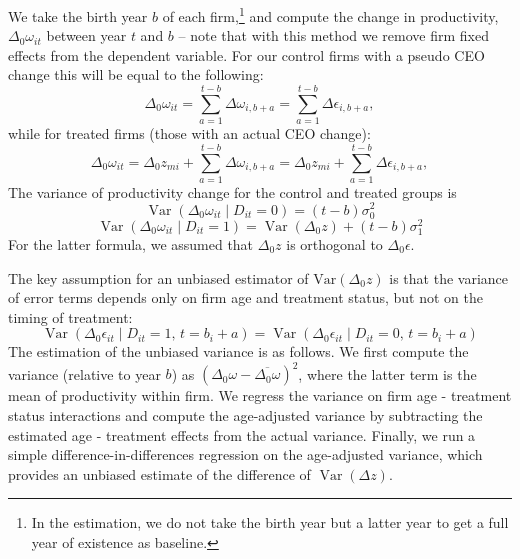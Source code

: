 \documentclass[11pt,a4paper]{article}
\newcommand{\Var}{\text{Var}}
\begin{document}
We take the birth year $b$ of each firm,\footnote{In the estimation, we do not take the birth year but a latter year to get a full year of existence as baseline.} and compute the change in productivity, $\Delta_0\omega_{it}$ between year $t$ and $b$ -- note that with this method we remove firm fixed effects from the dependent variable. For our control firms with a pseudo CEO change this will be equal to the following: 
\begin{equation}
    \Delta_{0}\omega_{it} = \sum_{a=1}^{t-b} \Delta \omega_{i,b+a} 
= \sum_{a=1}^{t-b} \Delta \epsilon_{i,b+a},
\end{equation}
while for treated firms (those with an actual CEO change):
\begin{equation}
    \Delta_{0}\omega_{it} = \Delta_0 z_{mi} + \sum_{a=1}^{t-b} \Delta \omega_{i,b+a} 
= \Delta_0 z_{mi} + \sum_{a=1}^{t-b} \Delta \epsilon_{i,b+a},
\end{equation}
The variance of productivity change for the control and treated groups is
\begin{equation}
\operatorname{Var}(\Delta_{0}\omega_{it} \mid D_{it} = 0) = (t - b)\sigma_{0}^{2}
\end{equation}
\begin{equation}
\operatorname{Var}(\Delta_{0}\omega_{it} \mid D_{it} = 1) = \operatorname{Var}(\Delta_{0}z) + (t - b)\sigma_{1}^{2}
\end{equation}
For the latter formula, we assumed that $\Delta_0z$ is orthogonal to $\Delta_0\epsilon$. 

The key assumption for an unbiased estimator of $\Var(\Delta_0z)$ is that the variance of error terms depends only on firm age and treatment status, but not on the timing of treatment:
\begin{equation}
    \operatorname{Var}(\Delta_{0}\epsilon_{it} \mid D_{it} = 1,\, t = b_{i} + a) = \operatorname{Var}(\Delta_{0}\epsilon_{it} \mid D_{it} = 0,\, t = b_{i} + a)
\end{equation}
The estimation of the unbiased variance is as follows. We first compute the variance (relative to year $b$) as $(\Delta_0\omega - \overline{\Delta_0\omega})^2$, where the latter term is the mean of productivity within firm. We regress the variance on firm age - treatment status interactions and compute the age-adjusted variance by subtracting the estimated age - treatment effects from the actual variance. Finally, we run a simple difference-in-differences regression on the age-adjusted variance, which provides an unbiased estimate of the difference of $\operatorname{Var}(\Delta z)$.
\end{document}
